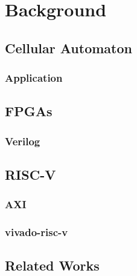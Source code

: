 \chapter{Background}
\label{ch:background}

\section{Cellular Automaton}

\subsection{Application}

\section{FPGAs}

\subsection{Verilog}

\section{RISC-V}

\subsection{AXI}

\subsection{vivado-risc-v}

\section{Related Works}